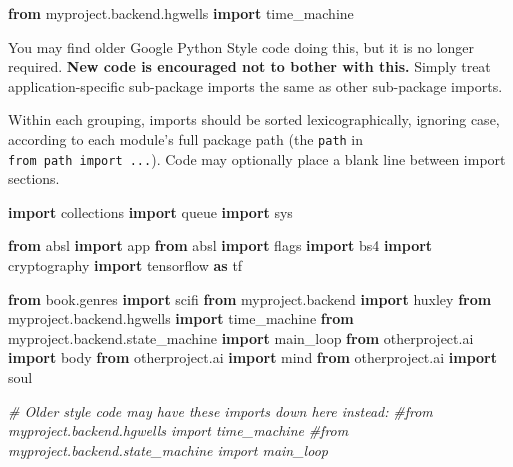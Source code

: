 \documentclass[
]{article}
\newenvironment{Shaded}{}{}
\newcommand{\CommentTok}[1]{\textcolor[rgb]{0.38,0.63,0.69}{\textit{#1}}}
\newcommand{\ImportTok}[1]{\textcolor[rgb]{0.00,0.50,0.00}{\textbf{#1}}}
\newcommand{\NormalTok}[1]{#1}
\begin{document}
\begin{enumerate}
\begin{samepage}
  \begin{Shaded}
\begin{Highlighting}[]
\ImportTok{from}\NormalTok{ myproject.backend.hgwells }\ImportTok{import}\NormalTok{ time\_machine}
\end{Highlighting}
\end{Shaded}
\end{samepage}

  You may find older Google Python Style code doing this, but it is no
  longer required. \textbf{New code is encouraged not to bother with
  this.} Simply treat application-specific sub-package imports the same
  as other sub-package imports.
\end{enumerate}

Within each grouping, imports should be sorted lexicographically,
ignoring case, according to each module's full package path (the
\texttt{path} in \texttt{from\ path\ import\ ...}). Code may optionally
place a blank line between import sections.

\begin{samepage}
\begin{Shaded}
\begin{Highlighting}[]
\ImportTok{import}\NormalTok{ collections}
\ImportTok{import}\NormalTok{ queue}
\ImportTok{import}\NormalTok{ sys}

\ImportTok{from}\NormalTok{ absl }\ImportTok{import}\NormalTok{ app}
\ImportTok{from}\NormalTok{ absl }\ImportTok{import}\NormalTok{ flags}
\ImportTok{import}\NormalTok{ bs4}
\ImportTok{import}\NormalTok{ cryptography}
\ImportTok{import}\NormalTok{ tensorflow }\ImportTok{as}\NormalTok{ tf}

\ImportTok{from}\NormalTok{ book.genres }\ImportTok{import}\NormalTok{ scifi}
\ImportTok{from}\NormalTok{ myproject.backend }\ImportTok{import}\NormalTok{ huxley}
\ImportTok{from}\NormalTok{ myproject.backend.hgwells }\ImportTok{import}\NormalTok{ time\_machine}
\ImportTok{from}\NormalTok{ myproject.backend.state\_machine }\ImportTok{import}\NormalTok{ main\_loop}
\ImportTok{from}\NormalTok{ otherproject.ai }\ImportTok{import}\NormalTok{ body}
\ImportTok{from}\NormalTok{ otherproject.ai }\ImportTok{import}\NormalTok{ mind}
\ImportTok{from}\NormalTok{ otherproject.ai }\ImportTok{import}\NormalTok{ soul}

\CommentTok{\# Older style code may have these imports down here instead:}
\CommentTok{\#from myproject.backend.hgwells import time\_machine}
\CommentTok{\#from myproject.backend.state\_machine import main\_loop}
\end{Highlighting}
\end{Shaded}
\end{samepage}
\end{document}
